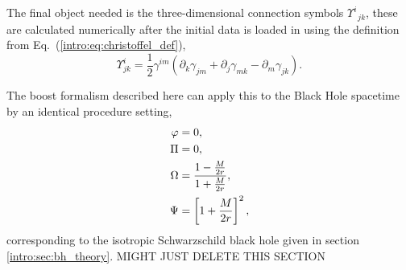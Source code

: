 The final object needed is the three-dimensional connection symbols $\Upsilon^i_{\,\,\,jk}$, these are calculated numerically after the initial data is loaded in using the definition from Eq.~(\ref{intro:eq:christoffel_def}),
 \begin{equation}
\Upsilon^i_{jk} = \frac{1}{2}\gamma^{im}\left( \partial_k \gamma_{jm} +  \partial_j \gamma_{mk} -  \partial_m \gamma_{jk} \right).
 \end{equation}

 The boost formalism described here can apply this to the Black Hole spacetime by an identical procedure setting, 
\begin{align} 
\varphi&=0,\\
\Pi&=0,\\
\Omega &= \frac{1-\frac{M}{2r}}{1+\frac{M}{2r}}, \\
 \Psi &= \left[1+\frac{M}{2r}\right]^2,
 \end{align}
 corresponding to the isotropic Schwarzschild black hole given in section \ref{intro:sec:bh_theory}.
 \newpage
 MIGHT JUST DELETE THIS SECTION
 
